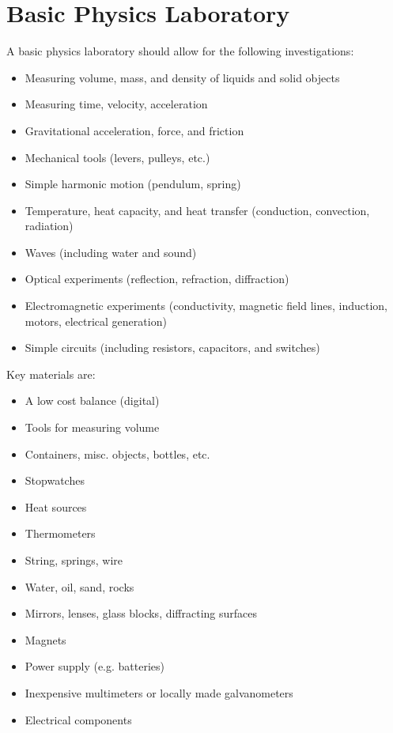 \section{Basic Physics Laboratory}

A basic physics laboratory should allow for the following investigations:
\begin{itemize}
\item{Measuring volume, mass, and density of liquids and solid objects}
\item{Measuring time, velocity, acceleration}
\item{Gravitational acceleration, force, and friction}
\item{Mechanical tools (levers, pulleys, etc.)}
\item{Simple harmonic motion (pendulum, spring)}
\item{Temperature, heat capacity, and heat transfer (conduction, convection, radiation)}
\item{Waves (including water and sound)}
\item{Optical experiments (reflection, refraction, diffraction)}
\item{Electromagnetic experiments (conductivity, magnetic field lines, induction, motors, electrical generation)}
\item{Simple circuits (including resistors, capacitors, and switches)}
\end{itemize}

Key materials are:
\begin{itemize}
\item{A low cost balance (digital)}
\item{Tools for measuring volume}
\item{Containers, misc. objects, bottles, etc.}
\item{Stopwatches}
\item{Heat sources}
\item{Thermometers}
\item{String, springs, wire}
\item{Water, oil, sand, rocks}
\item{Mirrors, lenses, glass blocks, diffracting surfaces}
\item{Magnets}
\item{Power supply (e.g. batteries)}
\item{Inexpensive multimeters or locally made galvanometers}
\item{Electrical components}
\end{itemize}

